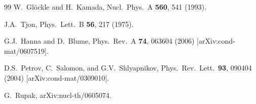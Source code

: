\documentclass[prc,preprint,showpacs,tightenlines,%
nofootinbib]{revtex4}
\begin{document}
\begin{thebibliography}{99}
W.~Gl\"ockle and H.~Kamada,
Nucl.\ Phys.\ A {\bf 560}, 541 (1993).

J.A.~Tjon, 
Phys.\ Lett.\ B {\bf 56}, 217 (1975).

G.J.~Hanna and D.~Blume, 
Phys.\ Rev.\ A {\bf 74}, 063604 (2006)
[arXiv:cond-mat/0607519].


 D.S.\ Petrov, C.\ Salomon, and G.V.\ Shlyapnikov,
Phys.\ Rev.\ Lett.\ {\bf 93}, 090404 (2004)
[arXiv:cond-mat/0309010].

G.~Rupak, arXiv:nucl-th/0605074.

\end{thebibliography}
\end{document}
